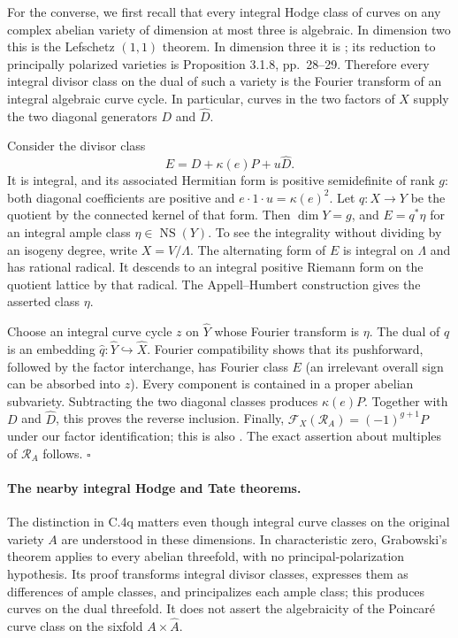 For the converse, we first recall that every integral Hodge
class of curves on any complex abelian variety of dimension
at most three is algebraic. In dimension two this is the
Lefschetz $(1,1)$ theorem. In dimension three it is
\citet[Corollary 3.1.9, pp.~29--30]{frC4Grabowski2004}; its
reduction to principally polarized varieties is Proposition
3.1.8, pp.~28--29. Therefore every integral divisor class on
the dual of such a variety is the Fourier transform of an
integral algebraic curve cycle. In particular, curves in the
two factors of $X$ supply the two diagonal generators $D$ and
$\widehat D$.

Consider the divisor class
\[
                 E=D+\kappa(e)P+u\widehat D.
\]
It is integral, and its associated Hermitian form is positive
semidefinite of rank $g$: both diagonal coefficients are
positive and $e\cdot1\cdot u=\kappa(e)^2$.
Let $q:X\to Y$ be the quotient by the connected kernel of that
form. Then $\dim Y=g$, and $E=q^*\eta$ for an integral ample
class $\eta\in\operatorname{NS}(Y)$. To see the integrality
without dividing by an isogeny degree, write $X=V/\Lambda$.
The alternating form of $E$ is integral on $\Lambda$ and has
rational radical. It descends to an integral positive Riemann
form on the quotient lattice by that radical. The
Appell--Humbert construction gives the asserted class $\eta$.

Choose an integral curve cycle $z$ on $\widehat Y$ whose
Fourier transform is $\eta$. The dual of $q$ is an embedding
$\widehat q:\widehat Y\hookrightarrow\widehat X$.
Fourier compatibility shows that its pushforward, followed by
the factor interchange, has Fourier class $E$ (an irrelevant
overall sign can be absorbed into $z$). Every component is
contained in a proper abelian subvariety. Subtracting the two
diagonal classes produces $\kappa(e)P$. Together with $D$ and
$\widehat D$, this proves the reverse inclusion.
Finally,
$\mathcal F_X(\mathcal R_A)=(-1)^{g+1}P$ under our factor
identification; this is also
\citet[Lemma 3.4, equation (6)]{cyBeckmannFortman2023}.
The exact assertion about multiples of $\mathcal R_A$ follows.
\hfill$\square$

\paragraph{The nearby integral Hodge and Tate theorems.}
The distinction in C.4q matters even though integral curve
classes on the original variety $A$ are understood in these
dimensions. In characteristic zero, Grabowski's theorem applies
to every abelian threefold, with no principal-polarization
hypothesis. Its proof transforms integral divisor classes,
expresses them as differences of ample classes, and principalizes
each ample class; this produces curves on the dual threefold.
It does not assert the algebraicity of the Poincar\'e curve
class on the sixfold $A\times\widehat A$.

